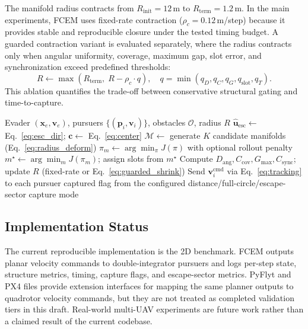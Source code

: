 \documentclass[journal]{IEEEtran}
\newcommand{\Dang}{D_{\mathrm{ang}}}
\newcommand{\Ccov}{C_{\mathrm{cov}}}
\newcommand{\Gmax}{G_{\max}}
\newcommand{\Csync}{C_{\mathrm{sync}}}
\begin{document}
The manifold radius contracts from $R_{\mathrm{init}} = 12$\,m to $R_{\mathrm{term}} = 1.2$\,m.
In the main experiments, FCEM uses fixed-rate contraction ($\rho_c = 0.12$\,m/step) because it provides stable and reproducible closure under the tested timing budget.
A guarded contraction variant is evaluated separately, where the radius contracts only when angular uniformity, coverage, maximum gap, slot error, and synchronization exceed predefined thresholds:
\begin{equation}
  R \leftarrow \max\!\left(R_{\mathrm{term}},\; R - \rho_c \cdot q\right),
  \quad q = \min(q_D, q_C, q_G, q_{\mathrm{slot}}, q_T).
  \label{eq:guarded_shrink}
\end{equation}
This ablation quantifies the trade-off between conservative structural gating and time-to-capture.

\begin{algorithm}[!t]
  \caption{FCEM control step}
  \label{alg:fcem}
  \begin{algorithmic}[1]
    \Require Evader $(\mathbf{x}_e, \mathbf{v}_e)$, pursuers $\{(\mathbf{p}_i, \mathbf{v}_i)\}$, obstacles $\mathcal{O}$, radius $R$
    \State $\hat{\mathbf{u}}_{\mathrm{esc}} \gets$ Eq.~\eqref{eq:esc_dir}; \quad $\mathbf{c} \gets$ Eq.~\eqref{eq:center}
    \State $\mathcal{M} \gets$ generate $K$ candidate manifolds (Eq.~\eqref{eq:radius_deform})
      \State $\pi_m \gets \arg\min_\pi J(\pi)$ with optional rollout penalty
    \EndFor
    \State $m^\star \gets \arg\min_m J(\pi_m)$; assign slots from $m^\star$
    \State Compute $\Dang, \Ccov, \Gmax, \Csync$; update $R$ (fixed-rate or Eq.~\eqref{eq:guarded_shrink})
    \State Send $\mathbf{v}_i^{\mathrm{cmd}}$ via Eq.~\eqref{eq:tracking} to each pursuer
    \State \Return captured flag from the configured distance/full-circle/escape-sector capture mode
  \end{algorithmic}
\end{algorithm}

\subsection{Implementation Status}
\label{sec:implementation}

The current reproducible implementation is the 2D benchmark.
FCEM outputs planar velocity commands to double-integrator pursuers and logs per-step state, structure metrics, timing, capture flags, and escape-sector metrics.
PyFlyt and PX4 files provide extension interfaces for mapping the same planner outputs to quadrotor velocity commands, but they are not treated as completed validation tiers in this draft.
Real-world multi-UAV experiments are future work rather than a claimed result of the current codebase.
\end{document}
